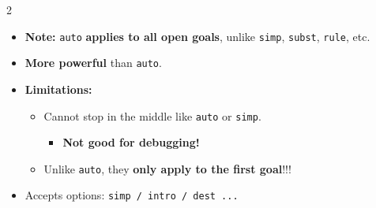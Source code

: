 \documentclass[9pt,a4paper]{extarticle}
\begin{document}
\begin{multicols*}{2}
\begin{tcolorbox}[title=2. The \texttt{auto} Proof Method]
\begin{itemize}[leftmargin=1em, itemsep=1.5pt]
    \item \textbf{Note:} \texttt{auto} \textbf{applies to all open goals}, unlike \texttt{simp}, \texttt{subst}, \texttt{rule}, etc.
\end{itemize}
\end{tcolorbox}

\vspace{-0.3em}

\begin{tcolorbox}[title=4. \texttt{force} \& \texttt{fastforce}]
\begin{itemize}[leftmargin=1em, itemsep=1.5pt]
    \item \textbf{More powerful} than \texttt{auto}.
    \item \textbf{Limitations:}
    \begin{itemize}[leftmargin=0.8em, label=--, itemsep=0pt]
        \item Cannot stop in the middle like \texttt{auto} or \texttt{simp}.
        \begin{itemize}[leftmargin=0.7em, label=$\rightarrow$, itemsep=0pt]
            \item \textbf{Not good for debugging!}
        \end{itemize}
        \item Unlike \texttt{auto}, they \textbf{only apply to the first goal}!!!
    \end{itemize}
    \item Accepts options: \texttt{simp / intro / dest ...}
\end{itemize}
\end{tcolorbox}

\end{multicols*}
\end{document}

